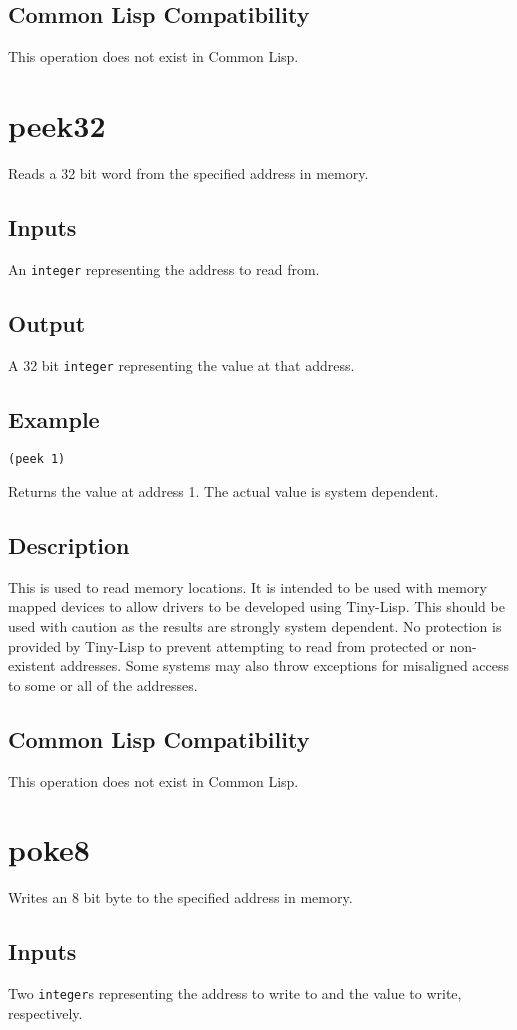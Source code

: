 \documentclass[10pt, openany]{book}
\newcommand{\datatype}[1]{\texttt{#1}}
\newcommand{\tl}{Tiny-Lisp}
\newcommand{\cl}{Common Lisp}
\begin{document}
\subsection{Common Lisp Compatibility}
This operation does not exist in \cl.

\section{peek32}
Reads a 32 bit word from the specified address in memory.
\subsection{Inputs}
An \datatype{integer} representing the address to read from.
\subsection{Output}
A 32 bit \datatype{integer} representing the value at that address.
\subsection{Example}
\begin{lstlisting}
(peek 1)
\end{lstlisting}
Returns the value at address 1.  The actual value is system dependent.
\subsection{Description}
This is used to read memory locations.  It is intended to be used with memory mapped devices to allow drivers to be developed using \tl{}.  This should be used with caution as the results are strongly system dependent.  No protection is provided by \tl{} to prevent attempting to read from protected or non-existent addresses.  Some systems may also throw exceptions for misaligned access to some or all of the addresses.
\subsection{Common Lisp Compatibility}
This operation does not exist in \cl.

\section{poke8}
Writes an 8 bit byte to the specified address in memory.
\subsection{Inputs}
Two \datatype{integer}s representing the address to write to and the value to write, respectively.
\end{document}
